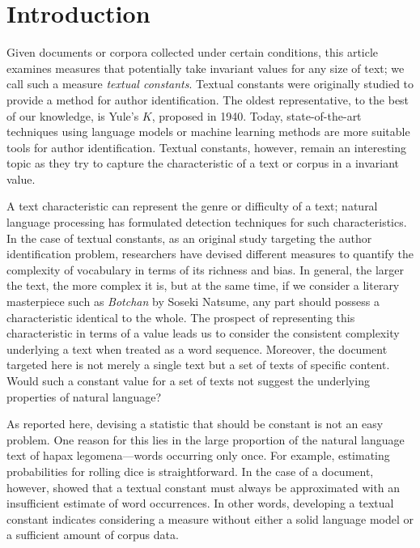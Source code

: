 \documentclass[english]{jnlp_1.4_rep}
\begin{document}
\maketitle

\section{Introduction}

Given documents or corpora collected under certain conditions, this article examines measures that potentially 
take invariant values for any size of text; we call such a measure  {\em textual constants}. Textual constants were originally studied to provide a method for author identification. The oldest representative, to the best of our knowledge, is Yule's $K$, proposed in 1940. Today, state-of-the-art techniques using language models or machine learning methods are more suitable tools for author identification. Textual constants, however, remain an interesting topic as they try to capture the characteristic of a text or corpus in a invariant value.

A text characteristic can represent the genre or difficulty of a text; natural language processing has formulated detection techniques for such characteristics. In the case of textual constants, as an original study targeting the author identification problem, researchers have devised different measures to quantify the complexity of vocabulary in terms of its richness and bias. In general, the larger the text, the more complex it is, but at the same time, if we consider a literary masterpiece such as {\em Botchan} by Soseki Natsume, any part should possess a characteristic identical to the whole. The prospect of representing this characteristic in terms of a value leads us to consider the consistent complexity underlying a text when treated as a word sequence. Moreover, the document targeted here is not merely a single text but a set of texts of specific content. Would such a constant value for a set of texts not suggest the underlying properties of natural language?

As reported here, devising a statistic that should be constant is not an easy problem. One reason for this lies in the large proportion of the natural language text of hapax legomena---words occurring only once. For example, estimating probabilities for rolling dice is straightforward. In the case of a document, however, \cite{Baayen} showed that a textual constant must always be approximated with an insufficient estimate of word occurrences. In other words, developing a textual constant indicates considering a measure without either a solid language model or a sufficient amount of corpus data. 
\end{document}
